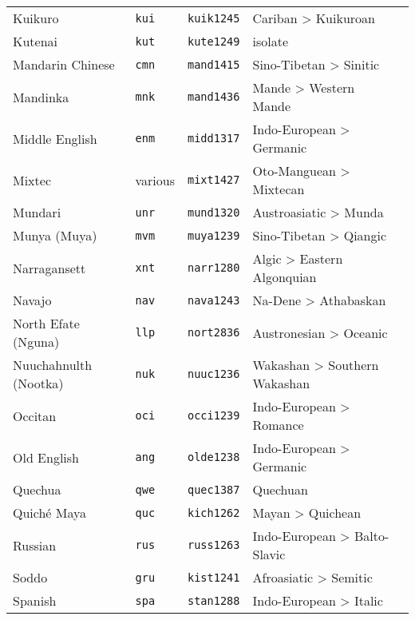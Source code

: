\begin{longtable}[c]{ l l l l l }
  Kuikuro                          & \texttt{kui}       & \texttt{kuik1245}   & Cariban > Kuikuroan\\
  Kutenai                          & \texttt{kut}       & \texttt{kute1249}   & isolate\\
  Mandarin Chinese                 & \texttt{cmn}       & \texttt{mand1415}   & Sino-Tibetan > Sinitic\\
  Mandinka                         & \texttt{mnk}       & \texttt{mand1436}   & Mande > Western Mande\\
  Middle English                   & \texttt{enm}       & \texttt{midd1317}   & Indo-European > Germanic\\
  Mixtec                           & various            & \texttt{mixt1427}   & Oto-Manguean > Mixtecan\\
  Mundari                          & \texttt{unr}       & \texttt{mund1320}   & Austroasiatic > Munda\\
  Munya (Muya)                     & \texttt{mvm}       & \texttt{muya1239}   & Sino-Tibetan > Qiangic\\
  Narragansett                     & \texttt{xnt}       & \texttt{narr1280}   & Algic > Eastern Algonquian\\
  Navajo                           & \texttt{nav}       & \texttt{nava1243}   & Na-Dene > Athabaskan\\
  North Efate (Nguna)              & \texttt{llp}       & \texttt{nort2836}   & Austronesian > Oceanic\\
  Nuuchahnulth (Nootka)            & \texttt{nuk}       & \texttt{nuuc1236}   & Wakashan > Southern Wakashan\\
  Occitan                          & \texttt{oci}       & \texttt{occi1239}   & Indo-European > Romance\\
  Old English                      & \texttt{ang}       & \texttt{olde1238}   & Indo-European > Germanic\\
  Quechua                          & \texttt{qwe}       & \texttt{quec1387}   & Quechuan\\
  Quiché Maya                      & \texttt{quc}       & \texttt{kich1262}   & Mayan > Quichean\\
  Russian                          & \texttt{rus}       & \texttt{russ1263}   & Indo-European > Balto-Slavic\\
  Soddo                            & \texttt{gru}       & \texttt{kist1241}   & Afroasiatic > Semitic\\
  Spanish                          & \texttt{spa}       & \texttt{stan1288}   & Indo-European > Italic\\

\end{longtable}
